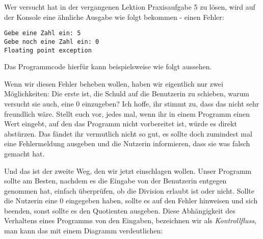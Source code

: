 
Wer versucht hat in der vergangenen Lektion Praxisaufgabe 5 zu lösen, wird auf der Konsole eine ähnliche Ausgabe wie folgt bekommen - einen Fehler:
\begin{verbatim}
Gebe eine Zahl ein: 5
Gebe noch eine Zahl ein: 0
Floating point exception
\end{verbatim}

Das Programmcode hierfür kann beispielsweise wie folgt aussehen.


Wenn wir diesen Fehler beheben wollen, haben wir eigentlich nur zwei
Möglichkeiten: Die erste ist, die Schuld auf die Benutzerin zu schieben, warum
versucht sie auch, eine 0 einzugeben? Ich hoffe, ihr stimmt zu, dass das nicht
sehr freundlich wäre. Stellt euch vor, jedes mal, wenn ihr in einem Programm
einen Wert eingebt, auf den das Programm nicht vorbereitet ist, würde es direkt
abstürzen. Das fändet ihr vermutlich nicht so gut, es sollte doch zumindest mal
eine Fehlermeldung ausgeben und die Nutzerin informieren, dass sie was falsch
gemacht hat.

Und das ist der zweite Weg, den wir jetzt einschlagen wollen. Unser Programm
sollte am Besten, nachdem es die Eingabe von der Benutzerin entgegen genommen
hat, einfach überprüfen, ob die Division erlaubt ist oder nicht. Sollte die
Nutzerin eine 0 eingegeben haben, sollte es auf den Fehler hinweisen und sich
beenden, sonst sollte es den Quotienten ausgeben. Diese Abhängigkeit des
Verhaltens eines Programms von den Eingaben, bezeichnen wir als
\emph{Kontrollfluss}, man kann das mit einem Diagramm verdeutlichen:

\begin{center}
\end{center}

